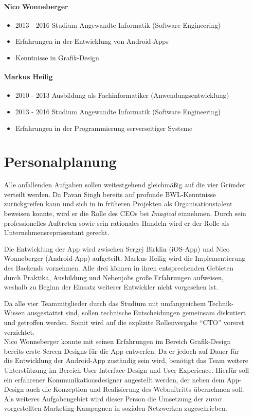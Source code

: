 \paragraph{Nico Wonneberger}
\begin{itemize}
\item 2013 - 2016 Studium Angewandte Informatik (Software Engineering)
\item Erfahrungen in der Entwicklung von Android-Apps
\item Kenntnisse in Grafik-Design
\end{itemize}

\paragraph{Markus Heilig}
\begin{itemize}
\item 2010 - 2013 Ausbildung als Fachinformatiker (Anwendungsentwicklung)
\item 2013 - 2016 Studium Angewandte Informatik (Software Engineering)
\item Erfahrungen in der Programmierung serverseitiger Systeme
\end{itemize}


\section{Personalplanung}

Alle anfallenden Aufgaben sollen weitestgehend gleichmäßig auf die vier Gründer verteilt werden.
Da Pavan Singh bereits auf profunde BWL-Kenntnisse zurückgreifen kann und sich in in früheren Projekten als Organisationstalent beweisen konnte, wird er die Rolle des CEOs bei \textit{Imagical} einnehmen. Durch sein professionelles Auftreten sowie sein rationales Handeln wird er der Rolle als Unternehmensrepräsentant gerecht.

Die Entwicklung der App wird zwischen Sergej Birklin (iOS-App) und Nico Wonneberger (Android-App) aufgeteilt. Markus Heilig wird die Implementierung des Backends vornehmen. Alle drei können in ihren entsprechenden Gebieten durch Praktika, Ausbildung und Nebenjobs große Erfahrungen aufweisen, weshalb zu Beginn der Einsatz weiterer Entwickler nicht vorgesehen ist.

Da alle vier Teammitglieder durch das Studium mit umfangreichem Technik-Wissen ausgestattet sind, sollen technische Entscheidungen gemeinsam diskutiert und getroffen werden. Somit wird auf die explizite Rollenvergabe ``CTO'' vorerst verzichtet. \\

Nico Wonneberger konnte mit seinen Erfahrungen im Bereich Grafik-Design bereits erste Screen-Designs für die App entwerfen.
Da er jedoch auf Dauer für die Entwicklung der Android-App zuständig sein wird, benötigt das Team weitere Unterstützung im Bereich User-Interface-Design und User-Experience. Hierfür soll ein erfahrener Kommunikationsdesigner angestellt werden, der neben dem App-Design auch die Konzeption und Realisierung des Webauftritts übernehmen soll. Als weiteres Aufgabengebiet wird dieser Person die Umsetzung der zuvor vorgestellten Marketing-Kampagnen in sozialen Netzwerken zugeschrieben.

